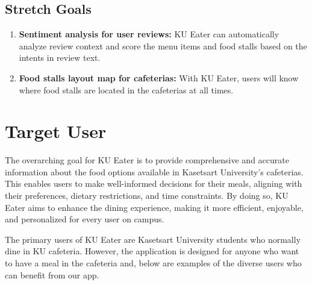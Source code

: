 \subsection{Stretch Goals}
\label{subsection:stretch-goals}

\begin{enumerate}[leftmargin=80pt]
    \item \textbf{Sentiment analysis for user reviews:} KU Eater can automatically analyze review context and score
    the menu items and food stalls based on the intents in review text.
    \item \textbf{Food stalls layout map for cafeterias:} With KU Eater, users will know where food stalls are located
    in the cafeterias at all times.
\end{enumerate}

\section{Target User}
\label{section:target-user}

The overarching goal for KU Eater is to provide comprehensive and accurate information about the food options available in
Kasetsart University's cafeterias. This enables users to make well-informed decisions for their meals,
aligning with their preferences, dietary restrictions, and time constraints. By doing so, KU Eater aims to enhance
the dining experience, making it more efficient, enjoyable, and personalized for every user on campus.

The primary users of KU Eater are Kasetsart University students who normally dine in KU cafeteria.
However, the application is designed for anyone who want to have a meal in the cafeteria and,
below are examples of the diverse users who can benefit from our app.

